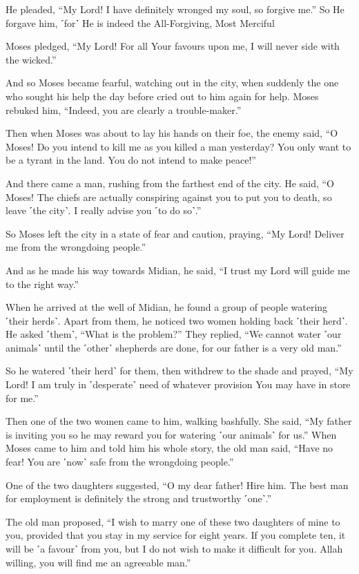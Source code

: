 He pleaded, “My Lord! I have definitely wronged my soul, so forgive me.” So He forgave him, ˹for˺ He is indeed the All-Forgiving, Most Merciful

Moses pledged, “My Lord! For all Your favours upon me, I will never side with the wicked.”

And so Moses became fearful, watching out in the city, when suddenly the one who sought his help the day before cried out to him again for help. Moses rebuked him, “Indeed, you are clearly a trouble-maker.”

Then when Moses was about to lay his hands on their foe, the enemy said, “O Moses! Do you intend to kill me as you killed a man yesterday? You only want to be a tyrant in the land. You do not intend to make peace!”

And there came a man, rushing from the farthest end of the city. He said, “O Moses! The chiefs are actually conspiring against you to put you to death, so leave ˹the city˺. I really advise you ˹to do so˺.”

So Moses left the city in a state of fear and caution, praying, “My Lord! Deliver me from the wrongdoing people.”

And as he made his way towards Midian, he said, “I trust my Lord will guide me to the right way.”

When he arrived at the well of Midian, he found a group of people watering ˹their herds˺. Apart from them, he noticed two women holding back ˹their herd˺. He asked ˹them˺, “What is the problem?” They replied, “We cannot water ˹our animals˺ until the ˹other˺ shepherds are done, for our father is a very old man.”

So he watered ˹their herd˺ for them, then withdrew to the shade and prayed, “My Lord! I am truly in ˹desperate˺ need of whatever provision You may have in store for me.”

Then one of the two women came to him, walking bashfully. She said, “My father is inviting you so he may reward you for watering ˹our animals˺ for us.” When Moses came to him and told him his whole story, the old man said, “Have no fear! You are ˹now˺ safe from the wrongdoing people.”

One of the two daughters suggested, “O my dear father! Hire him. The best man for employment is definitely the strong and trustworthy ˹one˺.”

The old man proposed, “I wish to marry one of these two daughters of mine to you, provided that you stay in my service for eight years. If you complete ten, it will be ˹a favour˺ from you, but I do not wish to make it difficult for you. Allah willing, you will find me an agreeable man.”


